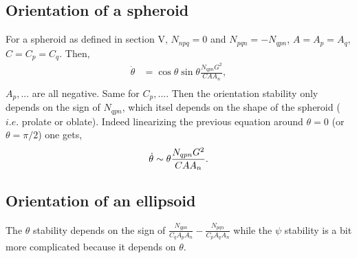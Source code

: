\documentclass[12pt]{My_preprint}
\begin{document}
\subsection{Orientation of a spheroid}

For a spheroid as defined in section V,  $N_{npq} = 0$  and $N_{pqn} = - N_{qpn}$, $A = A_p =A_q$, $C = C_p =C_q$. 
Then, 
\begin{align}
    \dot \theta  &= \cos \theta \sin \theta \frac{N_{qpn}G^2}{CA A_n}, \\
\end{align}
$A_p, ...$ are all negative. Same for $C_p, ...$. 
Then the orientation stability only depends on the sign of $N_{qpn}$, which itsel depends on the shape of the spheroid ($i.e.$ prolate or oblate).
Indeed linearizing the previous equation around $\theta =0$ (or $\theta =\pi/2$) one gets,
\begin{equation}
    \dot \theta  \sim  \theta \frac{N_{qpn}G^2}{CA A_n}. \\
\end{equation}

\subsection{Orientation of an ellipsoid}

The $\theta$ stability depends on the sign of $\frac{N_{qpn}}{C_qA_p A_n} - \frac{N_{pqn}}{C_pA_q A_n}$ while the $\psi$ stability is a bit more complicated because it depends on $\theta$. 






\appendix
\end{document}
